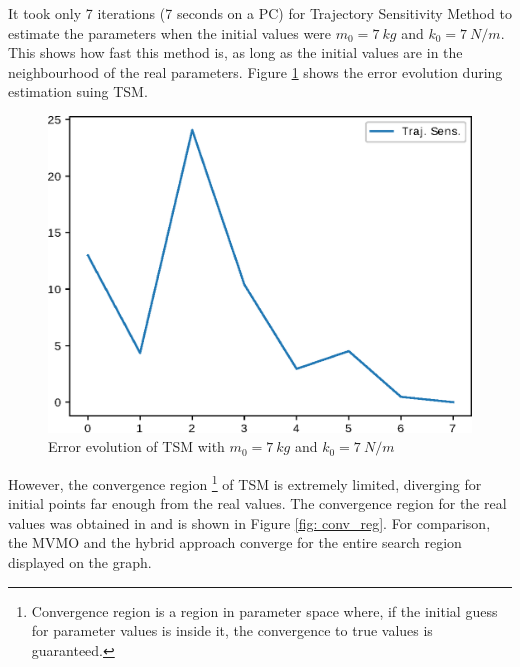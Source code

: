 It took only 7 iterations (7 seconds on a PC) for Trajectory Sensitivity Method to estimate the parameters when the initial values were $m_{0} = 7\ kg$ and $k_{0} = 7\ N/m$. This shows how fast this method is, as long as the initial values are in the neighbourhood of the real parameters. Figure \ref{fig: TS_conv} shows the error evolution during estimation suing TSM.

\begin{figure}[h]
	\caption{Error evolution of TSM with $m_{0} = 7\ kg$ and $k_{0} = 7\ N/m$}
	\begin{center}
		\includegraphics[scale=0.7]{Images/TS_conv.eps}
	\end{center}
	\label{fig: TS_conv}
\end{figure}

However, the convergence region \footnote{Convergence region is a region in parameter space where, if the initial guess for parameter values is inside it, the convergence to true values is guaranteed.} of TSM is extremely limited, diverging for initial points far enough from the real values. The convergence region for the real values was obtained in \cite{Ecyo} and is shown in Figure \ref{fig: conv_reg}. For comparison, the MVMO and the hybrid approach converge for the entire search region displayed on the graph.

